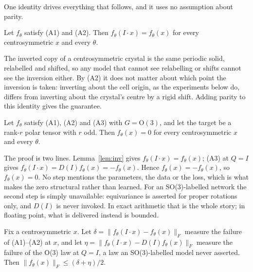 One identity drives everything that follows, and it uses no assumption about parity.

\begin{lemma}\label{lem:inv}
Let $f_\theta$ satisfy (A1) and (A2). Then $f_\theta(I\!\cdot\!x) = f_\theta(x)$ for every centrosymmetric $x$ and every $\theta$.
\end{lemma}

The inverted copy of a centrosymmetric crystal is the same periodic solid, relabelled and shifted, so any model that cannot see relabelling or shifts cannot see the inversion either. By (A2) it does not matter about which point the inversion is taken: inverting about the cell origin, as the experiments below do, differs from inverting about the crystal's centre by a rigid shift. Adding parity to this identity gives the guarantee.

\begin{theorem}\label{thm:zero}
Let $f_\theta$ satisfy (A1), (A2) and (A3) with $G = \mathrm{O}(3)$, and let the target be a rank-$r$ polar tensor with $r$ odd. Then $f_\theta(x) = 0$ for every centrosymmetric $x$ and every $\theta$.
\end{theorem}

The proof is two lines. Lemma~\ref{lem:inv} gives $f_\theta(I\!\cdot\!x)=f_\theta(x)$; (A3) at $Q=I$ gives $f_\theta(I\!\cdot\!x)=D(I)f_\theta(x)=-f_\theta(x)$. Hence $f_\theta(x)=-f_\theta(x)$, so $f_\theta(x)=0$. No step mentions the parameters, the data or the loss, which is what makes the zero structural rather than learned. For an SO(3)-labelled network the second step is simply unavailable: equivariance is asserted for proper rotations only, and $D(I)$ is never invoked. In exact arithmetic that is the whole story; in floating point, what is delivered instead is bounded.

\begin{proposition}\label{prop:floor}
Fix a centrosymmetric $x$. Let $\delta = \lVert f_\theta(I\!\cdot\!x) - f_\theta(x)\rVert_F$ measure the failure of (A1)--(A2) at $x$, and let $\eta = \lVert f_\theta(I\!\cdot\!x) - D(I) f_\theta(x)\rVert_F$ measure the failure of the O(3) law at $Q=I$, a law an SO(3)-labelled model never asserted. Then
$\lVert f_\theta(x)\rVert_F \le (\delta + \eta)/2$.
\end{proposition}

